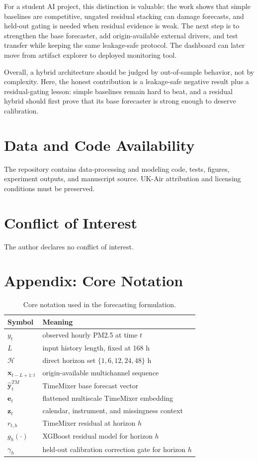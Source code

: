 \documentclass[sn-mathphys-num]{sn-jnl}
\newcommand{\Horizons}{\{1,6,12,24,48\}}
\begin{document}
For a student AI project, this distinction is valuable: the work shows that
simple baselines are competitive, ungated residual stacking can damage
forecasts, and held-out gating is needed when residual evidence is weak. The
next step is to strengthen the base forecaster, add origin-available external
drivers, and test transfer while keeping the same leakage-safe protocol. The
dashboard can later move from artifact explorer to deployed monitoring tool.

Overall, a hybrid architecture should be judged by out-of-sample behavior, not
by complexity. Here, the honest contribution is a leakage-safe negative result
plus a residual-gating lesson: simple baselines remain hard to beat, and a
residual hybrid should first prove that its base forecaster is strong enough to
deserve calibration.

\section*{Data and Code Availability}
The repository contains data-processing and modeling code, tests, figures,
experiment outputs, and manuscript source. UK-Air attribution and licensing
conditions must be preserved.

\section*{Conflict of Interest}
The author declares no conflict of interest.

\begingroup
\small


\endgroup

\section*{Appendix: Core Notation}
\begin{table}[h]
\centering
\caption{Core notation used in the forecasting formulation.}
\label{tab:notation}
\small
\begin{tabular}{ll}
\toprule
Symbol & Meaning \\
\midrule
$y_t$ & observed hourly PM2.5 at time $t$ \\
$L$ & input history length, fixed at 168 h \\
$\mathcal H$ & direct horizon set $\Horizons$ h \\
$\mathbf{x}_{t-L+1:t}$ & origin-available multichannel sequence \\
$\hat{\mathbf y}^{TM}_t$ & TimeMixer base forecast vector \\
$\mathbf e_t$ & flattened multiscale TimeMixer embedding \\
$\mathbf z_t$ & calendar, instrument, and missingness context \\
$r_{t,h}$ & TimeMixer residual at horizon $h$ \\
$g_h(\cdot)$ & XGBoost residual model for horizon $h$ \\
$\gamma_h$ & held-out calibration correction gate for horizon $h$ \\
\bottomrule
\end{tabular}
\end{table}
\end{document}
